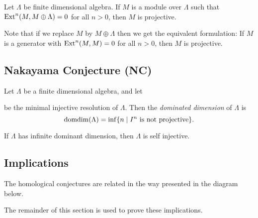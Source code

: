 \begin{conj} 
	Let $\Lambda$ be  finite dimensional algebra. If $M$ is a module over $\Lambda$ such that  $\operatorname{Ext}^n(M, M \oplus \Lambda) = 0$ for all $n > 0$, then $M$ is projective. 
\end{conj}

Note that if we replace $M$ by $M\oplus \Lambda$ then we get the equivalent formulation: If $M$ is a generator with $\operatorname{Ext}^n(M,M)=0$ for all $n>0$, then $M$ is projective.

\subsection*{Nakayama Conjecture (NC)}

\begin{defn}
	Let $\Lambda$ be a finite dimensional algebra, and let
	\begin{center}
	\end{center}
	be the minimal injective resolution of $\Lambda$. Then the \emph{dominated dimension} of $\Lambda$ is $$\operatorname{domdim}(\Lambda) = \inf\{n \; | \; I^n\text{ is not projective} \}.$$
\end{defn}

\begin{conj} 
	If $\Lambda$ has infinite dominant dimension, then $\Lambda$ is self injective.
\end{conj}

\subsection{Implications}
The homological conjectures are related in the way presented in the diagram below.


The remainder of this section is used to prove these implications.

